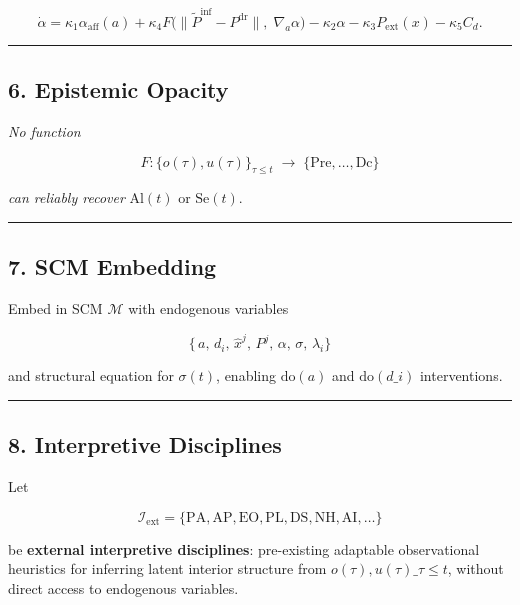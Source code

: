 \documentclass[
]{article}
\begin{document}
\[ \dot{\alpha} = \kappa_1 \alpha_{\mathrm{aff}}(a) + \kappa_4 F\bigl(\|\tilde{P}^{\mathrm{inf}} - P^{\mathrm{dr}}\|,\;\nabla_a \alpha\bigr) - \kappa_2 \alpha - \kappa_3 P_{\mathrm{ext}}(x) - \kappa_5 C_d. \]

\begin{center}\rule{0.5\linewidth}{0.5pt}\end{center}

\hypertarget{6-epistemic-opacity}{%
\subsection{6. Epistemic Opacity}\label{6-epistemic-opacity}}

\emph{No function}

\[ F:\{o(\tau),u(\tau)\}_{\tau\le t}\;\to\;\{\mathrm{Pre},\dots,\mathrm{Dc}\} \]

\emph{can reliably recover} \(\mathrm{Al}(t)\) or \(\mathrm{Se}(t)\).

\begin{center}\rule{0.5\linewidth}{0.5pt}\end{center}

\hypertarget{7-scm-embedding}{%
\subsection{7. SCM Embedding}\label{7-scm-embedding}}

Embed in SCM \(\mathcal M\) with endogenous variables

\[ \{\,a,\,d_i,\,\hat x^j,\,P^j,\,\alpha,\,\sigma,\,\lambda_i\} \]

and structural equation for \(\sigma(t)\), enabling \(\mathrm{do}(a)\)
and \(\mathrm{do}(d\_i)\) interventions.

\begin{center}\rule{0.5\linewidth}{0.5pt}\end{center}

\hypertarget{8-interpretive-disciplines}{%
\subsection{8. Interpretive
Disciplines}\label{8-interpretive-disciplines}}

Let

\[ \mathcal{I}_{\mathrm{ext}} = \{\mathrm{PA}, \mathrm{AP}, \mathrm{EO}, \mathrm{PL}, \mathrm{DS}, \mathrm{NH}, \mathrm{AI}, \dots\} \]

be \textbf{external interpretive disciplines}: pre-existing adaptable
observational heuristics for inferring latent interior structure from
\({o(\tau), u(\tau)}\_{\tau \le t}\), without direct access to
endogenous variables.
\end{document}
